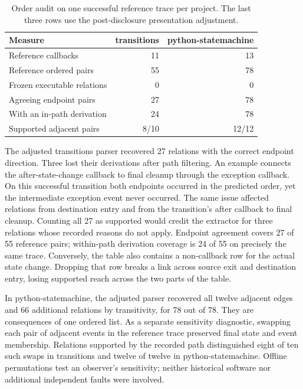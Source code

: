 \documentclass[conference]{IEEEtran}
\begin{document}
\begin{table}[t]
\centering\small
\caption{Order audit on one successful reference trace per project. The last three rows use the post-disclosure presentation adjustment.}\label{audit}
\setlength{\tabcolsep}{2pt}
\begin{tabular}{@{}lrr@{}}\hline
Measure & transitions & python-statemachine\\\hline
Reference callbacks & 11 & 13\\
Reference ordered pairs & 55 & 78\\
Frozen executable relations & 0 & 0\\
Agreeing endpoint pairs & 27 & 78\\
With an in-path derivation & 24 & 78\\
Supported adjacent pairs & 8/10 & 12/12\\\hline
\end{tabular}
\end{table}

The adjusted transitions parser recovered 27 relations with the correct endpoint direction. Three lost their derivations after path filtering. An example connects the after-state-change callback to final cleanup through the exception callback. On this successful transition both endpoints occurred in the predicted order, yet the intermediate exception event never occurred. The same issue affected relations from destination entry and from the transition's after callback to final cleanup. Counting all 27 as supported would credit the extractor for three relations whose recorded reasons do not apply. Endpoint agreement covers 27 of 55 reference pairs; within-path derivation coverage is 24 of 55 on precisely the same trace. Conversely, the table also contains a non-callback row for the actual state change. Dropping that row breaks a link across source exit and destination entry, losing supported reach across the two parts of the table.

In python-statemachine, the adjusted parser recovered all twelve adjacent edges and 66 additional relations by transitivity, for 78 out of 78. They are consequences of one ordered list. As a separate sensitivity diagnostic, swapping each pair of adjacent events in the reference trace preserved final state and event membership. Relations supported by the recorded path distinguished eight of ten such swaps in transitions and twelve of twelve in python-statemachine. Offline permutations test an observer's sensitivity; neither historical software nor additional independent faults were involved.
\end{document}

